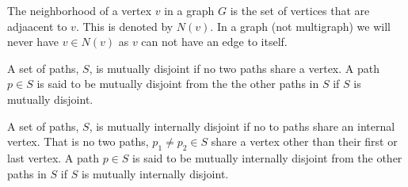 \documentclass{article}
\begin{document}
\begin{definition}[neighborhood]
	The neighborhood of a vertex $v$ in a graph $G$ is the set of vertices that are adjaacent to $v$. This is denoted by $N(v)$. In a graph (not multigraph) we will never have $v \in N(v)$ as $v$ can not have an edge to itself.
\end{definition}

\begin{definition}
	A set of paths, $S$, is mutually disjoint if no two paths share a vertex. A path $p\in S$ is said to be mutually disjoint from the the other paths in $S$ if $S$ is mutually disjoint.
\end{definition}

\begin{definition}
	A set of paths, $S$, is mutually internally disjoint if no to paths share an internal vertex. That is no two paths, $p_1\not=p_2\in S$ share a vertex other than their first or last vertex. A path $p\in S$ is said to be mutually internally disjoint from the other paths in $S$ if $S$ is mutually internally disjoint.
\end{definition}
\end{document}

